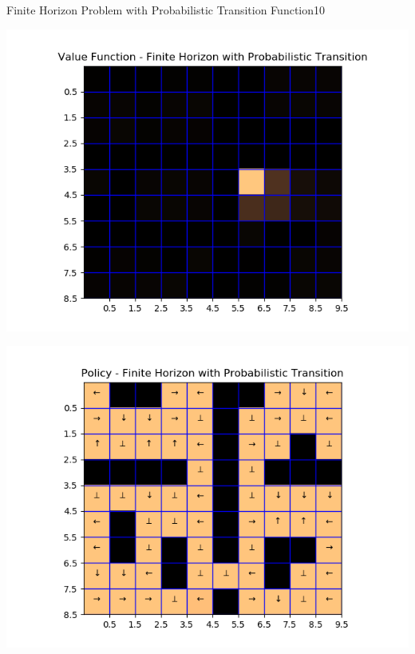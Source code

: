 \begin{questions}
\begin{question}{Finite Horizon Problem with Probabilistic Transition Function}{10}
\begin{answer}
	\begin{answer}
		\noindent\begin{minipage}{.5\textwidth}
			\centering
			\includegraphics[width=1\textwidth]{img/value_2d.png} 
			\label{fig:2d1}            
		\end{minipage}%
		\begin{minipage}{.5\textwidth}
			\centering
			\includegraphics[width=1\textwidth]{img/policy_2d.png} 
			\label{fig:2d2}               
		\end{minipage}
	\end{answer}
	

\end{answer}
\end{question}
\end{questions}
